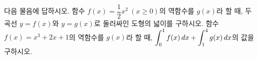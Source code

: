 다음 물음에 답하시오.
 함수 $f(x)=\dfrac{1}{2}x^2\ (x\ge 0)$의 역함수를 $g(x)$라 할 때, 두 곡선 $y=f(x)$와 $y=g(x)$로 둘러싸인 도형의 넓이를 구하시오.
 함수 $f(x)=x^3+2x+1$의 역함수를 $g(x)$라 할 때, $\displaystyle\int_{0}^{1} f(x)\mkern3mu dx+\int_{1}^{4} g(x)\mkern3mu dx$의 값을 구하시오.
